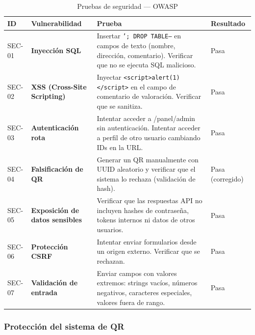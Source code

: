 \begin{table}[H]
    \centering
    \caption{Pruebas de seguridad — OWASP}
    \label{tab:seguridad}
    \small
    \begin{tabular}{|>{\raggedright\arraybackslash}p{}|>{\raggedright\arraybackslash}p{}|>{\raggedright\arraybackslash}p{}|>{\raggedright\arraybackslash}p{}|}
        \hline
        \textbf{ID} & \textbf{Vulnerabilidad} & \textbf{Prueba} & \textbf{Resultado} \\
        \hline
        SEC-01 & \textbf{Inyección SQL} & Insertar \texttt{'; DROP TABLE--} en campos de texto (nombre, dirección, comentario). Verificar que no se ejecuta SQL malicioso. & Pasa \\
        \hline
        SEC-02 & \textbf{XSS (Cross-Site Scripting)} & Inyectar \texttt{<script>alert(1)</script>} en el campo de comentario de valoración. Verificar que se sanitiza. & Pasa \\
        \hline
        SEC-03 & \textbf{Autenticación rota} & Intentar acceder a /panel/admin sin autenticación. Intentar acceder a perfil de otro usuario cambiando IDs en la URL. & Pasa \\
        \hline
        SEC-04 & \textbf{Falsificación de QR} & Generar un QR manualmente con UUID aleatorio y verificar que el sistema lo rechaza (validación de hash). & Pasa (corregido) \\
        \hline
        SEC-05 & \textbf{Exposición de datos sensibles} & Verificar que las respuestas API no incluyen hashes de contraseña, tokens internos ni datos de otros usuarios. & Pasa \\
        \hline
        SEC-06 & \textbf{Protección CSRF} & Intentar enviar formularios desde un origen externo. Verificar que se rechazan. & Pasa \\
        \hline
        SEC-07 & \textbf{Validación de entrada} & Enviar campos con valores extremos: strings vacíos, números negativos, caracteres especiales, valores fuera de rango. & Pasa \\
        \hline
    \end{tabular}
\end{table}

\subsubsection{Protección del sistema de QR}

